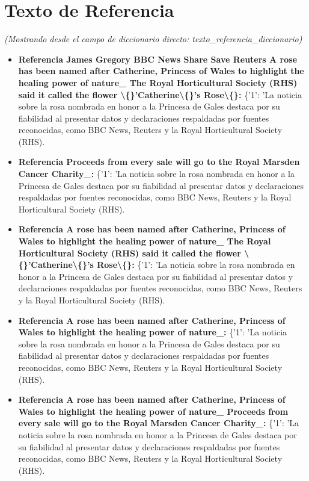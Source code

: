 \documentclass[10pt,a4paper]{article}
\begin{document}
\section*{Texto de Referencia}
    \textit{(Mostrando desde el campo de diccionario directo: texto\_referencia\_diccionario)}
    \begin{itemize}[leftmargin=*]
            \item \textbf{Referencia James Gregory BBC News Share Save Reuters A rose has been named after Catherine, Princess of Wales to highlight the healing power of nature\_ The Royal Horticultural Society (RHS) said it called the flower \textbackslash\{\}'Catherine\textbackslash\{\}'s Rose\textbackslash\{\}:} \{'1': 'La noticia sobre la rosa nombrada en honor a la Princesa de Gales destaca por su fiabilidad al presentar datos y declaraciones respaldadas por fuentes reconocidas, como BBC News, Reuters y la Royal Horticultural Society (RHS).
            \item \textbf{Referencia Proceeds from every sale will go to the Royal Marsden Cancer Charity\_:} \{'1': 'La noticia sobre la rosa nombrada en honor a la Princesa de Gales destaca por su fiabilidad al presentar datos y declaraciones respaldadas por fuentes reconocidas, como BBC News, Reuters y la Royal Horticultural Society (RHS).
            \item \textbf{Referencia A rose has been named after Catherine, Princess of Wales to highlight the healing power of nature\_ The Royal Horticultural Society (RHS) said it called the flower \textbackslash\{\}'Catherine\textbackslash\{\}'s Rose\textbackslash\{\}:} \{'1': 'La noticia sobre la rosa nombrada en honor a la Princesa de Gales destaca por su fiabilidad al presentar datos y declaraciones respaldadas por fuentes reconocidas, como BBC News, Reuters y la Royal Horticultural Society (RHS).
            \item \textbf{Referencia A rose has been named after Catherine, Princess of Wales to highlight the healing power of nature\_:} \{'1': 'La noticia sobre la rosa nombrada en honor a la Princesa de Gales destaca por su fiabilidad al presentar datos y declaraciones respaldadas por fuentes reconocidas, como BBC News, Reuters y la Royal Horticultural Society (RHS).
            \item \textbf{Referencia A rose has been named after Catherine, Princess of Wales to highlight the healing power of nature\_ Proceeds from every sale will go to the Royal Marsden Cancer Charity\_:} \{'1': 'La noticia sobre la rosa nombrada en honor a la Princesa de Gales destaca por su fiabilidad al presentar datos y declaraciones respaldadas por fuentes reconocidas, como BBC News, Reuters y la Royal Horticultural Society (RHS).
    \end{itemize}
\vspace{1em}
\end{document}
